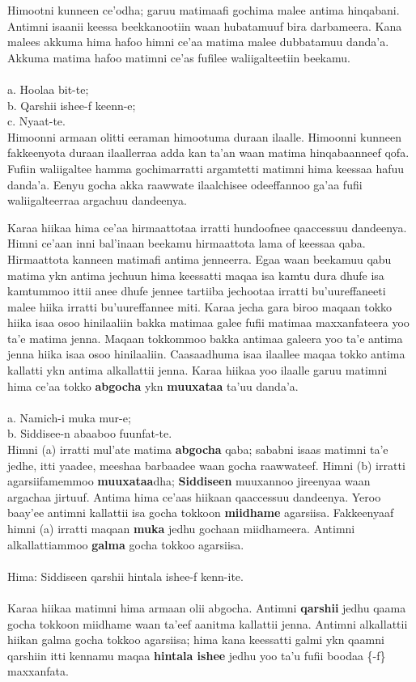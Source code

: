 \documentclass[11pt,b5paper]{book}
\begin{document}
Himootni kunneen ce’odha; garuu matimaafi gochima malee antima hinqabani. Antimni isaanii keessa beekkanootiin waan hubatamuuf bira darbameera. Kana malees akkuma hima hafoo himni ce’aa matima malee dubbatamuu danda’a. Akkuma matima hafoo matimni ce’as fufilee waliigalteetiin beekamu.\\
\\
a. Hoolaa bit-te; \\
b. Qarshii ishee-f keenn-e; \\
c. Nyaat-te.\\

Himoonni armaan olitti eeraman himootuma duraan ilaalle. Himoonni kunneen fakkeenyota duraan ilaallerraa adda kan ta’an waan matima hinqabaanneef qofa. Fufiin waliigaltee hamma gochimarratti argamtetti matimni hima keessaa hafuu danda’a. Eenyu gocha akka raawwate ilaalchisee odeeffannoo
ga’aa fufii waliigalteerraa argachuu dandeenya.

Karaa hiikaa hima ce’aa  hirmaattotaa irratti hundoofnee qaaccessuu dandeenya. Himni ce’aan inni bal’inaan beekamu hirmaattota lama of keessaa qaba. Hirmaattota kanneen matimafi antima jenneerra. Egaa waan beekamuu qabu matima ykn antima jechuun hima keessatti maqaa isa kamtu dura dhufe isa
kamtummoo ittii anee dhufe jennee tartiiba jechootaa irratti bu’uureffaneeti malee hiika irratti bu’uureffannee miti. Karaa jecha gara biroo maqaan tokko hiika isaa osoo hinilaaliin bakka
matimaa galee fufii matimaa maxxanfateera yoo ta’e matima jenna. Maqaan tokkommoo bakka antimaa galeera yoo ta’e antima jenna hiika isaa osoo hinilaaliin. Caasaadhuma isaa ilaallee maqaa tokko antima kallatti ykn antima alkallattii jenna. Karaa hiikaa yoo ilaalle garuu matimni hima ce’aa tokko
\textbf{abgocha} ykn \textbf{muuxataa} ta’uu danda’a.\\
\\
a. Namich-i muka mur-e;\\
b. Siddisee-n abaaboo fuunfat-te. \\

Himni (a) irratti mul’ate matima \textbf{abgocha} qaba; sababni isaas matimni ta’e jedhe, itti yaadee, meeshaa barbaadee waan gocha raawwateef. Himni (b) irratti agarsiifamemmoo \textbf{muuxataa}dha; \textbf{Siddiseen} muuxannoo jireenyaa waan argachaa jirtuuf. Antima hima ce’aas hiikaan qaaccessuu dandeenya. Yeroo baay’ee antimni kallattii isa gocha tokkoon \textbf{miidhame} agarsiisa. Fakkeenyaaf himni (a) irratti maqaan \textbf{muka} jedhu gochaan miidhameera. Antimni alkallattiammoo \textbf{galma} gocha tokkoo agarsiisa. \\
\\
Hima: Siddiseen qarshii hintala ishee-f kenn-ite.\\
\\
Karaa hiikaa matimni hima armaan olii abgocha. Antimni \textbf{qarshii} jedhu qaama gocha tokkoon miidhame waan ta’eef aanitma kallattii jenna. Antimni alkallattii hiikan galma gocha tokkoo agarsiisa; hima kana keessatti galmi ykn qaamni qarshiin itti kennamu maqaa \textbf{hintala ishee }jedhu yoo ta’u fufii boodaa \{-f\} maxxanfata. 
\end{document}

